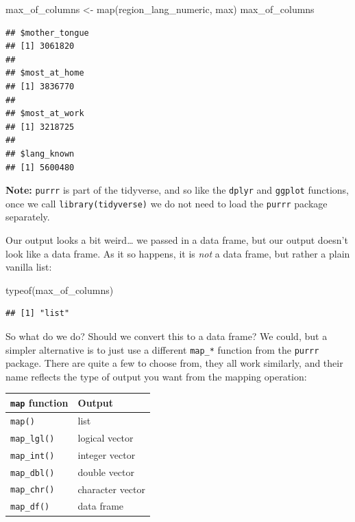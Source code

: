 \documentclass[
]{krantz}
\makeatletter
\newenvironment{Shaded}{\begin{snugshade}}{\end{snugshade}}
\newcommand{\FunctionTok}[1]{\textcolor[rgb]{0,0,0}{#1}}
\newcommand{\NormalTok}[1]{#1}
\newcommand{\OtherTok}[1]{\textcolor[rgb]{0.37,0.37,0.37}{#1}}
\renewenvironment{quote}{\begin{VF}}{\end{VF}}
\newenvironment{kframe}{%
\medskip{}
\setlength{\fboxsep}{.8em}
 \def\at@end@of@kframe{}%
 \ifinner\ifhmode%
  \def\at@end@of@kframe{\end{minipage}}%
  \begin{minipage}{\columnwidth}%
 \fi\fi%
 \def\FrameCommand##1{\hskip\@totalleftmargin \hskip-\fboxsep
 \colorbox{shadecolor}{##1}\hskip-\fboxsep
     \hskip-\linewidth \hskip-\@totalleftmargin \hskip\columnwidth}%
 \MakeFramed {\advance\hsize-\width
   \@totalleftmargin\z@ \linewidth\hsize
   \@setminipage}}%
 {\par\unskip\endMakeFramed%
 \at@end@of@kframe}
\renewenvironment{Shaded}{\begin{kframe}}{\end{kframe}}
\makeatother
\begin{document}
\begin{Shaded}
\begin{Highlighting}[]
\NormalTok{max\_of\_columns }\OtherTok{\textless{}{-}} \FunctionTok{map}\NormalTok{(region\_lang\_numeric, max)}
\NormalTok{max\_of\_columns}
\end{Highlighting}
\end{Shaded}

\begin{verbatim}
## $mother_tongue
## [1] 3061820
## 
## $most_at_home
## [1] 3836770
## 
## $most_at_work
## [1] 3218725
## 
## $lang_known
## [1] 5600480
\end{verbatim}

\begin{quote}
\textbf{Note:} \texttt{purrr} is part of the tidyverse, and so like the \texttt{dplyr} and \texttt{ggplot} functions, once we call \texttt{library(tidyverse)} we
do not need to load the \texttt{purrr} package separately.
\end{quote}

Our output looks a bit weird\ldots{} we passed in a data frame, but our output doesn't look like a data frame. As it so happens, it is \emph{not} a
data frame, but rather a plain vanilla list:

\begin{Shaded}
\begin{Highlighting}[]
\FunctionTok{typeof}\NormalTok{(max\_of\_columns)}
\end{Highlighting}
\end{Shaded}

\begin{verbatim}
## [1] "list"
\end{verbatim}

So what do we do? Should we convert this to a data frame? We could, but a simpler alternative is to just use a different \texttt{map\_*} function from
the \texttt{purrr} package. There are quite a few to choose from, they all work similarly, and their name reflects the type of output you want from
the mapping operation:

\begin{longtable}[]{@{}ll@{}}
\toprule
\texttt{map} function & Output\tabularnewline
\midrule
\endhead
\texttt{map()} & list\tabularnewline
\texttt{map\_lgl()} & logical vector\tabularnewline
\texttt{map\_int()} & integer vector\tabularnewline
\texttt{map\_dbl()} & double vector\tabularnewline
\texttt{map\_chr()} & character vector\tabularnewline
\texttt{map\_df()} & data frame\tabularnewline
\bottomrule
\end{longtable}
\end{document}
